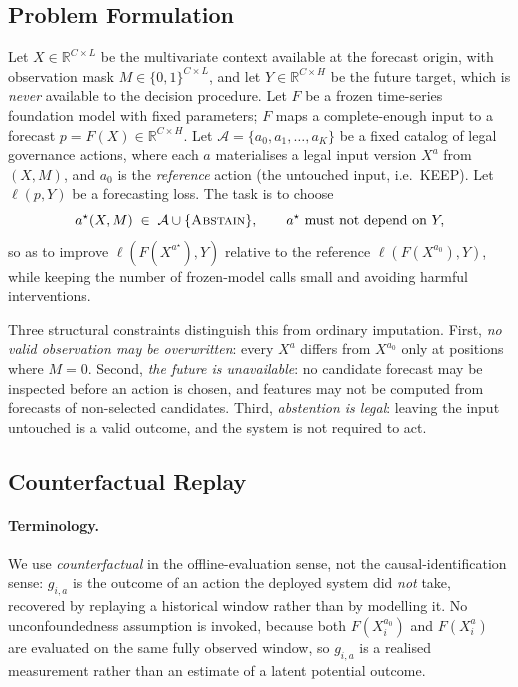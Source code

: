 \documentclass{article}
\newcommand{\calA}{\mathcal{A}}
\newcommand{\loss}{\ell}
\begin{document}
\subsection{Problem Formulation}
\label{sec:method-problem}
Let $X \in \mathbb{R}^{C \times L}$ be the multivariate context available at the forecast
origin, with observation mask $M \in \{0,1\}^{C \times L}$, and let
$Y \in \mathbb{R}^{C \times H}$ be the future target, which is \emph{never} available to
the decision procedure. Let $F$ be a frozen time-series foundation model with fixed
parameters; $F$ maps a complete-enough input to a forecast
$p = F(X) \in \mathbb{R}^{C \times H}$. Let
$\calA = \{a_0, a_1, \dots, a_K\}$ be a fixed catalog of legal governance actions, where
each $a$ materialises a legal input version $X^{a}$ from $(X, M)$, and $a_0$ is the
\emph{reference} action (the untouched input, i.e.\ KEEP). Let $\loss(p, Y)$ be a
forecasting loss. The task is to choose
\begin{equation}
  a^\star(X, M) \;\in\; \calA \cup \{\textsc{Abstain}\},
  \qquad
  a^\star \text{ must not depend on } Y ,
  \label{eq:objective}
\end{equation}
so as to improve $\loss(F(X^{a^\star}), Y)$ relative to the reference
$\loss(F(X^{a_0}), Y)$, while keeping the number of frozen-model calls small and avoiding
harmful interventions.

Three structural constraints distinguish this from ordinary imputation. First, \emph{no
valid observation may be overwritten}: every $X^{a}$ differs from $X^{a_0}$ only at
positions where $M = 0$. Second, \emph{the future is unavailable}: no candidate forecast
may be inspected before an action is chosen, and features may not be computed from
forecasts of non-selected candidates. Third, \emph{abstention is legal}: leaving the
input untouched is a valid outcome, and the system is not required to act.

\subsection{Counterfactual Replay}
\label{sec:method-replay}
\paragraph{Terminology.}
We use \emph{counterfactual} in the offline-evaluation sense, not the causal-identification
sense: $g_{i,a}$ is the outcome of an action the deployed system did \emph{not} take,
recovered by replaying a historical window rather than by modelling it. No unconfoundedness
assumption is invoked, because both $F(X_i^{a_0})$ and $F(X_i^{a})$ are evaluated on the
same fully observed window, so $g_{i,a}$ is a realised measurement rather than an estimate
of a latent potential outcome.
\end{document}
